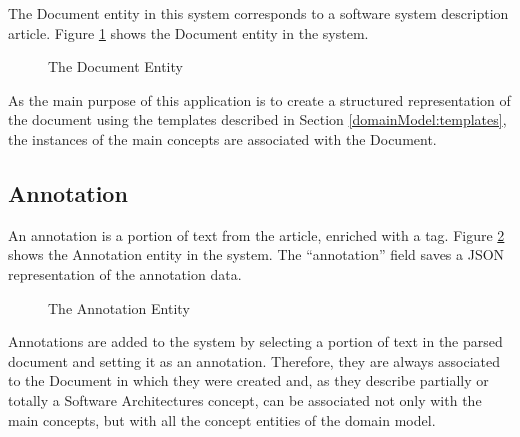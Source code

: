 \documentclass[conference]{IEEEtran}
\begin{document}
The Document entity in this system corresponds to a software system description article. Figure \ref{figure:documentEntity} shows the Document entity in the system.
\begin{figure}[ht]
\centering
\renewcommand {\umltextcolor}{black}
\renewcommand {\umlfillcolor}{none}
\renewcommand {\umldrawcolor}{black}

\caption{The Document Entity}
\label{figure:documentEntity}
\end{figure}

As the main purpose of this application is to create a structured representation of the document using the templates described in Section \ref{domainModel:templates}, the instances of the main concepts are associated with the Document.  

\subsection{Annotation}
\label{architecture:annotation}

An annotation is a portion of text from the article, enriched with a tag. Figure \ref{figure:annotationEntity} shows the Annotation entity in the system. The ``annotation'' field saves a JSON representation of the annotation data.
\begin{figure}[ht]
\centering
\renewcommand {\umltextcolor}{black}
\renewcommand {\umlfillcolor}{none}
\renewcommand {\umldrawcolor}{black}

\caption{The Annotation Entity}
\label{figure:annotationEntity}
\end{figure}
Annotations are added to the system by selecting a portion of text in the parsed document and setting it as an annotation. Therefore, they are always associated to the Document in which they were created and, as they describe partially or totally a Software Architectures concept, can be associated not only with the main concepts, but with all the concept entities of the domain model. 
\end{document}
